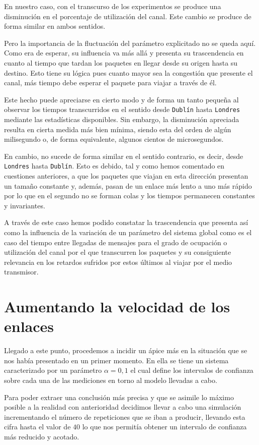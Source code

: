 \documentclass{article}[10pt]
\begin{document}
		En nuestro caso, con el transcurso de los experimentos se produce una disminución en el porcentaje de utilización del canal. Este cambio se produce de forma similar en ambos sentidos.

		Pero la importancia de la fluctuación del parámetro explicitado no se queda aquí. Como era de esperar, su influencia va más allá y presenta su trascendencia en cuanto al tiempo que tardan los paquetes en llegar desde su origen hasta su destino. Esto tiene su lógica pues cuanto mayor sea la congestión que presente el canal, más tiempo debe esperar el paquete para viajar a través de él.

		Este hecho puede apreciarse en cierto modo y de forma un tanto pequeña al observar los tiempos transcurridos en el sentido desde \texttt{Dublín} hasta \texttt{Londres} mediante las estadísticas disponibles. Sin embargo, la disminución apreciada resulta en cierta medida más bien mínima, siendo esta del orden de algún milisegundo o, de forma equivalente, algunos cientos de microsegundos.

		En cambio, no sucede de forma similar en el sentido contrario, es decir, desde \texttt{Londres} hasta \texttt{Dublín}. Esto es debido, tal y como hemos comentado en cuestiones anteriores, a que los paquetes que viajan en esta dirección presentan un tamaño constante y, además, pasan de un enlace más lento a uno más rápido por lo que en el segundo no se forman colas y los tiempos permanecen constantes y invariantes.

		A través de este caso hemos podido constatar la trascendencia que presenta así como la influencia de la variación de un parámetro del sistema global como es el caso del tiempo entre llegadas de mensajes para el grado de ocupación o utilización del canal por el que transcurren los paquetes y su consiguiente relevancia en los retardos sufridos por estos últimos al viajar por el medio transmisor.

	\section{Aumentando la velocidad de los enlaces}
		Llegado a este punto, procedemos a incidir un ápice más en la situación que se nos había presentado en un primer momento. En ella se tiene un sistema caracterizado por un parámetro $\alpha = 0,1$ el cual define los intervalos de confianza sobre cada una de las mediciones en torno al modelo llevadas a cabo.

		Para poder extraer una conclusión más precisa y que se asimile lo máximo posible a la realidad con anterioridad decidimos llevar a cabo una simulación incrementando el número de repeticiones que se iban a producir, llevando esta cifra hasta el valor de $40$ lo que nos permitía obtener un intervalo de confianza más reducido y acotado.
\end{document}

